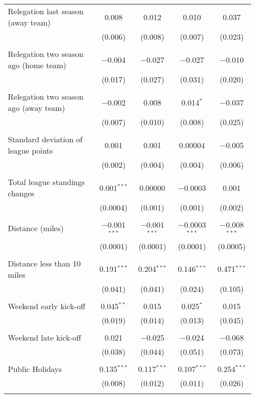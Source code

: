\begin{tabular}{@{\extracolsep{5pt}}lcccc}
 Relegation last season  (away team) & 0.008 & 0.012 & 0.010 & 0.037 \\ 
  & (0.006) & (0.008) & (0.007) & (0.023) \\ 
  & & & & \\ 
 Relegation two season ago (home team) & $-$0.004 & $-$0.027 & $-$0.027 & $-$0.010 \\ 
  & (0.017) & (0.027) & (0.031) & (0.020) \\ 
  & & & & \\ 
 Relegation two season ago (away team) & $-$0.002 & 0.008 & 0.014$^{*}$ & $-$0.037 \\ 
  & (0.007) & (0.010) & (0.008) & (0.025) \\ 
  & & & & \\ 
 Standard deviation of league points & 0.001 & 0.001 & 0.00004 & $-$0.005 \\ 
  & (0.002) & (0.004) & (0.004) & (0.006) \\ 
  & & & & \\ 
 Total league standings changes & 0.001$^{***}$ & 0.00000 & $-$0.0003 & 0.001 \\ 
  & (0.0004) & (0.001) & (0.001) & (0.002) \\ 
  & & & & \\ 
 Distance (miles) & $-$0.001$^{***}$ & $-$0.001$^{***}$ & $-$0.0003$^{***}$ & $-$0.008$^{***}$ \\ 
  & (0.0001) & (0.0001) & (0.0001) & (0.0005) \\ 
  & & & & \\ 
 Distance less than 10 miles & 0.191$^{***}$ & 0.204$^{***}$ & 0.146$^{***}$ & 0.471$^{***}$ \\ 
  & (0.041) & (0.041) & (0.024) & (0.105) \\ 
  & & & & \\ 
 Weekend early kick-off & 0.045$^{**}$ & 0.015 & 0.025$^{*}$ & 0.015 \\ 
  & (0.019) & (0.014) & (0.013) & (0.045) \\ 
  & & & & \\ 
 Weekend late kick-off & 0.021 & $-$0.025 & $-$0.024 & $-$0.068 \\ 
  & (0.038) & (0.044) & (0.051) & (0.073) \\ 
  & & & & \\ 
 Public Holidays & 0.135$^{***}$ & 0.117$^{***}$ & 0.107$^{***}$ & 0.254$^{***}$ \\ 
  & (0.008) & (0.012) & (0.011) & (0.026) \\ 
  & & & & \\ 

\end{tabular}
